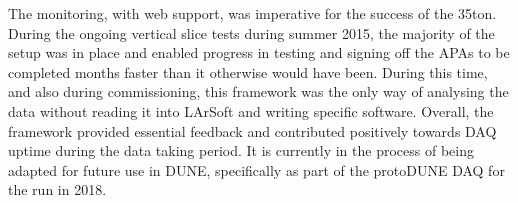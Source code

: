 The monitoring, with web support, was imperative for the success of the 35ton.  During the ongoing vertical slice tests during summer 2015, the majority of the setup was in place and enabled progress in testing and signing off the APAs to be completed months faster than it otherwise would have been.  During this time, and also during commissioning, this framework was the only way of analysing the data without reading it into LArSoft and writing specific software.  Overall, the framework provided essential feedback and contributed positively towards DAQ uptime during the data taking period.  It is currently in the process of being adapted for future use in DUNE, specifically as part of the protoDUNE DAQ for the run in 2018.
